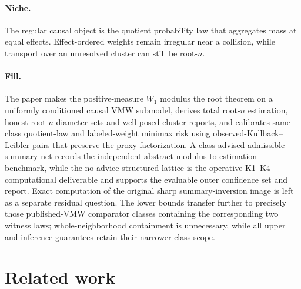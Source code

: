\documentclass{article}
\begin{document}
\paragraph{Niche.} The regular causal object is the quotient probability law that aggregates mass at equal effects. Effect-ordered weights remain irregular near a collision, while transport over an unresolved cluster can still be root-\(n\).

\paragraph{Fill.} The paper makes the positive-measure \(W_1\) modulus the root theorem on a uniformly conditioned causal VMW submodel, derives total root-\(n\) estimation, honest root-\(n\)-diameter sets and well-posed cluster reports, and calibrates same-class quotient-law and labeled-weight minimax risk using observed-Kullback--Leibler pairs that preserve the proxy factorization.  A class-advised admissible-summary net records the independent abstract modulus-to-estimation benchmark, while the no-advice structured lattice is the operative K1--K4 computational deliverable and supports the evaluable outer confidence set and report.  Exact computation of the original sharp summary-inversion image is left as a separate residual question.  The lower bounds transfer further to precisely those published-VMW comparator classes containing the corresponding two witness laws; whole-neighborhood containment is unnecessary, while all upper and inference guarantees retain their narrower class scope.

\section{Related work}
\end{document}
